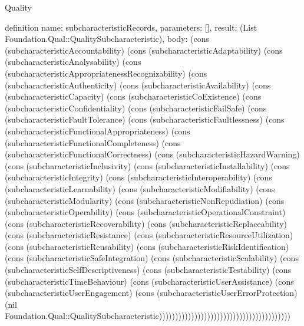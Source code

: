 \begin{lexlean}{Quality}
\begin{semanticmodule}
definition{
  name: subcharacteristicRecords,
  parameters: [],
  result: (List Foundation.Qual::QualitySubcharacteristic),
  body: (cons (subcharacteristicAccountability) (cons (subcharacteristicAdaptability) (cons (subcharacteristicAnalysability) (cons (subcharacteristicAppropriatenessRecognizability) (cons (subcharacteristicAuthenticity) (cons (subcharacteristicAvailability) (cons (subcharacteristicCapacity) (cons (subcharacteristicCoExistence) (cons (subcharacteristicConfidentiality) (cons (subcharacteristicFailSafe) (cons (subcharacteristicFaultTolerance) (cons (subcharacteristicFaultlessness) (cons (subcharacteristicFunctionalAppropriateness) (cons (subcharacteristicFunctionalCompleteness) (cons (subcharacteristicFunctionalCorrectness) (cons (subcharacteristicHazardWarning) (cons (subcharacteristicInclusivity) (cons (subcharacteristicInstallability) (cons (subcharacteristicIntegrity) (cons (subcharacteristicInteroperability) (cons (subcharacteristicLearnability) (cons (subcharacteristicModifiability) (cons (subcharacteristicModularity) (cons (subcharacteristicNonRepudiation) (cons (subcharacteristicOperability) (cons (subcharacteristicOperationalConstraint) (cons (subcharacteristicRecoverability) (cons (subcharacteristicReplaceability) (cons (subcharacteristicResistance) (cons (subcharacteristicResourceUtilization) (cons (subcharacteristicReusability) (cons (subcharacteristicRiskIdentification) (cons (subcharacteristicSafeIntegration) (cons (subcharacteristicScalability) (cons (subcharacteristicSelfDescriptiveness) (cons (subcharacteristicTestability) (cons (subcharacteristicTimeBehaviour) (cons (subcharacteristicUserAssistance) (cons (subcharacteristicUserEngagement) (cons (subcharacteristicUserErrorProtection) (nil Foundation.Qual::QualitySubcharacteristic)))))))))))))))))))))))))))))))))))))))))
}


\end{semanticmodule}
\end{lexlean}
